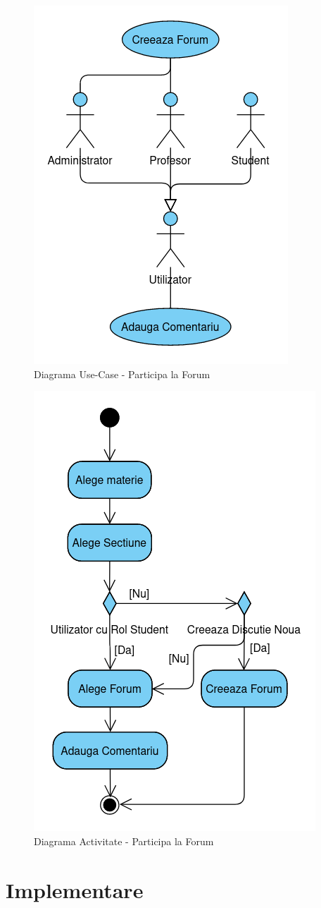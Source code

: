 \documentclass[12pt, a4paper, oneside, romanian]{teza-upb}
\begin{document}
\begin{figure}[H]
\centering
\includegraphics*[width=0.45\columnwidth]{diagrama-use-case-participa-la-forum}
\caption{Diagrama Use-Case - Participa la Forum}
\label{diagrama-use-case-participa-la-forum}
\end{figure}

\begin{figure}[H]
\centering
\includegraphics*[width=0.5\columnwidth]{diagrama-activitate-participa-la-forum}
\caption{Diagrama Activitate - Participa la Forum}
\label{diagrama-activitate-participa-la-forum}
\end{figure}

\chapter{Implementare}
\end{document}

